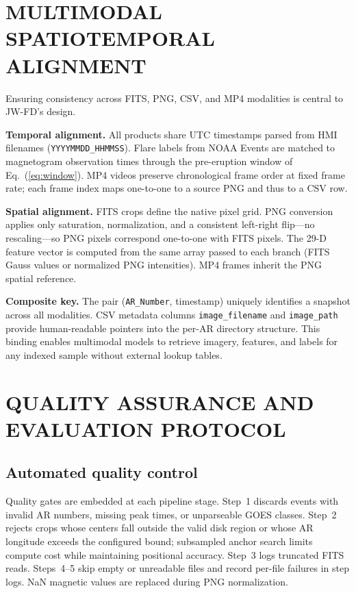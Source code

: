 \documentclass[]{spie}
\begin{document}
\section{MULTIMODAL SPATIOTEMPORAL ALIGNMENT}
\label{sec:alignment}

Ensuring consistency across FITS, PNG, CSV, and MP4 modalities is central to JW-FD's design.

\textbf{Temporal alignment.} All products share UTC timestamps parsed from HMI filenames (\texttt{YYYYMMDD\_HHMMSS}). Flare labels from NOAA Events are matched to magnetogram observation times through the pre-eruption window of Eq.~(\ref{eq:window}). MP4 videos preserve chronological frame order at fixed frame rate; each frame index maps one-to-one to a source PNG and thus to a CSV row.

\textbf{Spatial alignment.} FITS crops define the native pixel grid. PNG conversion applies only saturation, normalization, and a consistent left-right flip---no rescaling---so PNG pixels correspond one-to-one with FITS pixels. The 29-D feature vector is computed from the same array passed to each branch (FITS Gauss values or normalized PNG intensities). MP4 frames inherit the PNG spatial reference.

\textbf{Composite key.} The pair (\texttt{AR\_Number}, timestamp) uniquely identifies a snapshot across all modalities. CSV metadata columns \texttt{image\_filename} and \texttt{image\_path} provide human-readable pointers into the per-AR directory structure. This binding enables multimodal models to retrieve imagery, features, and labels for any indexed sample without external lookup tables.

\section{QUALITY ASSURANCE AND EVALUATION PROTOCOL}
\label{sec:qc}

\subsection{Automated quality control}

Quality gates are embedded at each pipeline stage. Step~1 discards events with invalid AR numbers, missing peak times, or unparseable GOES classes. Step~2 rejects crops whose centers fall outside the valid disk region or whose AR longitude exceeds the configured bound; subsampled anchor search limits compute cost while maintaining positional accuracy. Step~3 logs truncated FITS reads. Steps~4--5 skip empty or unreadable files and record per-file failures in step logs. NaN magnetic values are replaced during PNG normalization.
\end{document}
